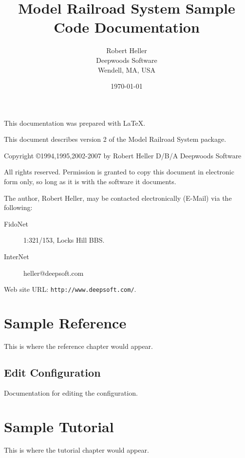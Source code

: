 \documentclass[12pt,notitlepage,twoside]{book}
\begin{document}
\title{Model Railroad System Sample Code Documentation}
\author{Robert Heller \\ Deepwoods Software \\ Wendell, MA, USA}
\date{\today}
\begin{titlepage}
\maketitle


This documentation was prepared with \LaTeX.

This document describes version 2 of the Model Railroad System package.

\vspace{.25in}



{\small Copyright \copyright 1994,1995,2002-2007 by Robert Heller D/B/A Deepwoods Software}

\vspace{.25in}

All rights reserved.  Permission is granted to copy this document in
electronic form only, so long as it is with the software it
documents. 

The author, Robert Heller, may be contacted electronically (E-Mail) via
the following:

\begin{description}
\item[FidoNet] 1:321/153, Locks Hill BBS.
\item[InterNet] heller@deepsoft.com
\end{description}

Web site URL: {\tt http://www.deepsoft.com/}.

\thispagestyle{empty}
\setcounter{page}{0}
\clearpage

\end{titlepage}
\tableofcontents
\listoffigures
\listoftables
\cleardoublepage

\chapter{Sample Reference}

This is where the reference chapter would appear.

\section{Edit Configuration}

Documentation for editing the configuration.

\chapter{Sample Tutorial}

This is where the tutorial chapter would appear. 



\end{document}
